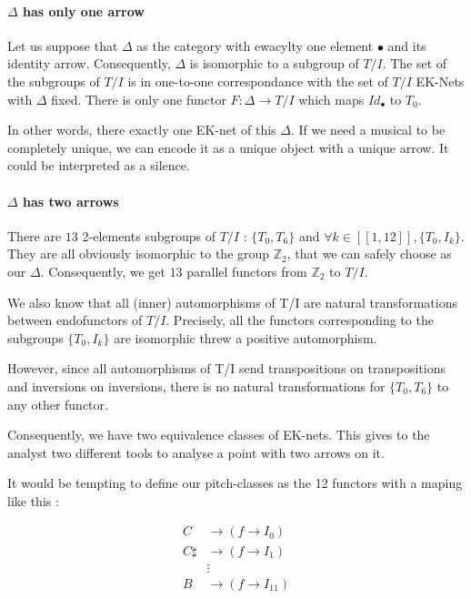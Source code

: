 \paragraph{$\Delta$ has only one arrow}
Let us suppose that $\Delta$ as the category with ewacylty one element $\bullet$ and its identity arrow. Consequently, $\Delta$ is isomorphic to a subgroup of $T/I$. The set of the subgroups of $T/I$ is in one-to-one correspondance with the set of $T/I$ EK-Nets with $\Delta$ fixed.
There is only one functor $F:\Delta \rightarrow T/I$ which maps $Id_\bullet$ to $T_0$.

In other words, there exactly one EK-net of this $\Delta$. If we need a musical to be completely unique, we can encode it as a unique object with a unique arrow. It could be interpreted as a silence.



\paragraph{$\Delta$ has two arrows}
There are $13$ 2-elements subgroups of $T/I$ : $\{T_0,T_6\}$ and $\forall k\in[\![1,12]\!], \{T_0,I_k\}$. They are all obviously isomorphic to the group $\mathbb{Z}_2$, that we can safely choose as our $\Delta$. Consequently, we get $13$ parallel functors from $\mathbb{Z}_2$ to $T/I$.

We also know that all (inner) automorphisms of T/I are natural transformations between endofunctors of $T/I$. Precisely, all the functors corresponding to the subgroups $\{T_0,I_k\}$ are isomorphic threw a positive automorphism.

However, since all automorphisms of T/I send transpositions on transpositions and inversions on inversions, there is no natural transformations for $\{T_0,T_6\}$ to any other functor.

Consequently, we have two equivalence classes of EK-nets. This gives to the analyst two different tools to analyse a point with two arrows on it.

It would be tempting to define our pitch-classes as the 12 functors with a maping like this :


\begin{eqnarray*}
    C & \rightarrow (f \rightarrow I_0) \\
    C\sharp &\rightarrow (f \rightarrow I_1) \\
    &\vdots \\
    B & \rightarrow (f \rightarrow I_{11})
\end{eqnarray*}

